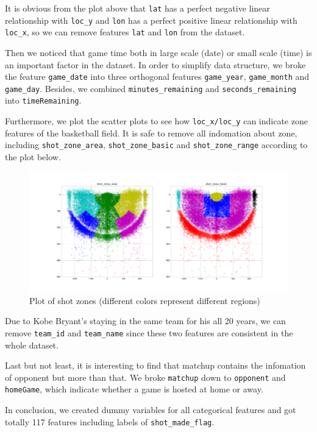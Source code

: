 \documentclass[a4paper,11pt,onecolumn,twoside]{article}
\begin{document}
\par
It is obvious from the plot above that \texttt{lat} has a perfect negative linear relationship with \texttt{loc\_y} and \texttt{lon} has a perfect positive linear relationship with \texttt{loc\_x}, so we can remove features \texttt{lat} and \texttt{lon} from the dataset.\par
Then we noticed that game time both in large scale (date) or small scale (time) is an important factor in the dataset. In order to simplify data structure, we broke the feature \texttt{game\_date} into three orthogonal features \texttt{game\_year}, \texttt{game\_month} and \texttt{game\_day}. Besides, we combined \texttt{minutes\_remaining} and \texttt{seconds\_remaining} into \texttt{timeRemaining}.\par 
Furthermore, we plot the scatter plots to see how \texttt{loc\_x/loc\_y} can indicate zone features of the basketball field. It is safe to remove all indomation about zone, including \texttt{shot\_zone\_area}, \texttt{shot\_zone\_basic} and \texttt{shot\_zone\_range} according to the plot below.\par
\begin{figure}[htbp]
	\centering
	\includegraphics[width=1.0\textwidth]{shot_zone_plot.png}
	\caption{Plot of shot zones (different colors represent different regions)}
\end{figure}
Due to Kobe Bryant's staying in the same team for his all 20 years, we can remove \texttt{team\_id} and \texttt{team\_name} since these two features are consistent in the whole dataset.\par
Last but not least, it is interesting to find that matchup contains the infomation of opponent but more than that. We broke \texttt{matchup} down to \texttt{opponent} and \texttt{homeGame}, which indicate whether a game is hosted at home or away.\par 
In conclusion, we created dummy variables for all categorical features and got totally 117 features including labels of \texttt{shot\_made\_flag}.
\end{document}

